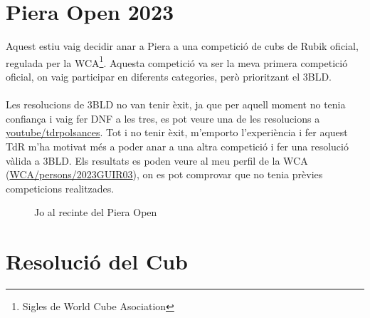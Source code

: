 \chapter{Piera Open 2023}

Aquest estiu vaig decidir anar a Piera a una competició de cubs de Rubik oficial, regulada per la WCA\footnote{Sigles de World Cube Asociation}. Aquesta competició va ser la meva primera competició oficial, on vaig participar en diferents categories, però prioritzant el 3BLD.
\\\\Les resolucions de 3BLD no van tenir èxit, ja que per aquell moment no tenia confiança i vaig fer DNF a les tres, es pot veure una de les resolucions a \href{https://www.youtube.com/@TDRPolSances}{youtube/tdrpolsances}.
Tot i no tenir èxit, m'emporto l'experiència i fer aquest TdR m'ha motivat més a poder anar a una altra competició i fer una resolució vàlida a 3BLD. Els resultats es poden veure al meu perfil de la WCA (\href{https://www.worldcubeassociation.org/persons/2023GUIR03?event=333bf}{WCA/persons/2023GUIR03}), on es pot comprovar que no tenia prèvies competicions realitzades.

\begin{figure}[!ht]
    \centering
    \caption{Jo al recinte del Piera Open}
    \label{fig:piera}
\end{figure}


\chapter{Resolució del Cub}

